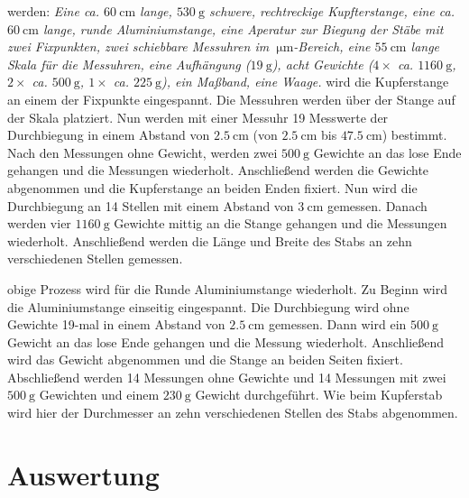 \justifying werden: \textit{ Eine ca. $\SI{60}{\centi\meter}$ lange, $\SI{530}{\gram}$ schwere, rechtreckige Kupfterstange, eine ca. $\SI{60}{\centi\meter}$ lange, runde
Aluminiumstange, eine Aperatur zur Biegung der Stäbe mit zwei Fixpunkten, zwei schiebbare Messuhren im $\SI{}{\micro\meter}$-Bereich, eine
$\SI{55}{\centi\meter}$ lange Skala für die Messuhren, eine Aufhängung ($\SI{19}{\gram}$), acht Gewichte ($4\times$ ca. $\SI{1160}{\gram}$, 
$2\times$ ca. $\SI{500}{\gram}$, $1\times$ ca. $\SI{225}{\gram}$), ein Maßband, eine Waage.
}
\justifying wird die Kupferstange an einem der Fixpunkte eingespannt. Die Messuhren werden über der Stange auf der Skala platziert. Nun werden mit 
einer Messuhr 19 Messwerte der Durchbiegung in einem Abstand von $\SI{2.5}{\centi\meter}$ (von $\SI{2.5}{\centi\meter}$ bis $\SI{47.5}{\centi\meter}$) 
bestimmt. Nach den Messungen ohne Gewicht, werden zwei $\SI{500}{\gram}$ Gewichte an das lose Ende gehangen und die Messungen wiederholt. Anschließend
werden die Gewichte abgenommen und die Kupferstange an beiden Enden fixiert. Nun wird die Durchbiegung an 14 Stellen mit einem Abstand von 
$\SI{3}{\centi\meter}$ gemessen. Danach werden vier $\SI{1160}{\gram}$ Gewichte mittig an die Stange gehangen und die Messungen wiederholt. 
Anschließend werden die Länge und Breite des Stabs an zehn verschiedenen Stellen gemessen.

\justifying obige Prozess wird für die Runde Aluminiumstange wiederholt. Zu Beginn wird die Aluminiumstange einseitig eingespannt. Die Durchbiegung
wird ohne Gewichte 19-mal in einem Abstand von $\SI{2.5}{\centi\meter}$ gemessen. Dann wird ein $\SI{500}{\gram}$ Gewicht an das lose Ende 
gehangen und die Messung wiederholt. Anschließend wird das Gewicht abgenommen und die Stange an beiden Seiten fixiert. Abschließend werden 
14 Messungen ohne Gewichte und 14 Messungen mit zwei $\SI{500}{\gram}$ Gewichten und einem $\SI{230}{\gram}$ Gewicht durchgeführt. Wie beim Kupferstab
wird hier der Durchmesser an zehn verschiedenen Stellen des Stabs abgenommen.


\section{Auswertung}\justifying


